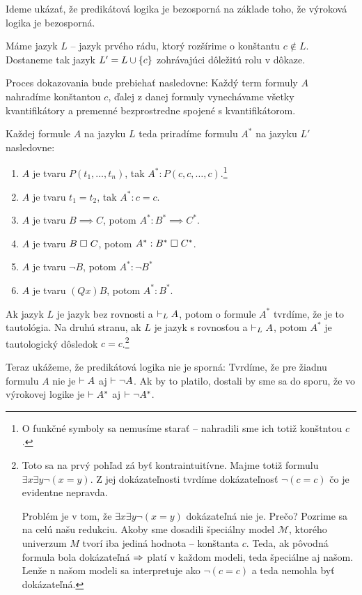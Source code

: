 \begin{priklad}
    Ideme ukázať, že predikátová logika je bezosporná na základe toho,
    že výroková logika je bezosporná.

    Máme jazyk $L$ -- jazyk prvého rádu,
    ktorý rozšírime o konštantu $c \notin L$.
    Dostaneme tak jazyk $L' = L \cup \{c\}$ zohrávajúci dôležitú
    rolu v dôkaze.

    Proces dokazovania bude prebiehať nasledovne:
    Každý term formuly $A$ nahradíme konštantou $c$,
    ďalej z danej formuly vynechávame všetky kvantifikátory a
    premenné bezprostredne spojené s kvantifikátorom.

    Každej formule $A$ na jazyku $L$ teda priradíme
    formulu $A^*$ na jazyku $L'$ nasledovne:
    \begin{enumerate}
        \item $A$ je tvaru $P(t_1, \dots ,t_n)$,
                tak $A^*: P(c, c, \dots,c)$.\footnote{
                O funkčné symboly sa nemusíme starať -- nahradili sme
                ich totiž konštntou $c$.
            }

        \item $A$ je tvaru $t_1=t_2$,
                tak $A^*: c=c$.

        \item $A$ je tvaru $B \implies C$,
                potom $A^*: B^* \implies C^*$.

        \item $A$ je tvaru $B \;\square\; C$,
                potom $A^*: B^* \;\square\; C^*$.

        \item $A$ je tvaru $\neg B$,
                potom $A^*: \neg B^*$

        \item $A$ je tvaru $(Qx) B$, potom $A^*: B^*$.
    \end{enumerate}

    Ak jazyk $L$ je jazyk bez rovnosti a $\vdash_L A$, potom
    o formule $A^*$ tvrdíme, že je to tautológia.
    Na druhú stranu, ak $L$ je jazyk s rovnosťou a $\vdash_L A$,
    potom $A^*$ je tautologický dôsledok $c=c$.\footnote{
        Toto sa na prvý pohľad zá byť kontraintuitívne. Majme totiž
        formulu $\exists x \exists y \neg (x=y)$. Z jej dokázateľnosti
        tvrdíme dokázateľnosť $\neg (c=c)$ čo je evidentne nepravda.

        Problém je v tom, že $\exists x \exists y \neg (x=y)$
        dokázateľná nie je. Prečo? Pozrime sa na celú našu redukciu.
        Akoby sme dosadili špeciálny model $\mathcal{M}$, ktorého
        univerzum $M$ tvorí iba jediná hodnota -- konštanta $c$.
        Teda, ak pôvodná formula bola dokázateľná $\Rightarrow$ platí v
        každom modeli, teda špeciálne aj našom. Lenže n našom modeli
        sa interpretuje ako $\neg (c=c)$ a teda nemohla byť
        dokázateľná.
    }

    Teraz ukážeme, že predikátová logika nie je sporná:
    Tvrdíme, že pre žiadnu formulu $A$ nie je $\vdash A$ aj 
    $\vdash \neg A$.
    Ak by to platilo, dostali by sme sa do sporu,
    že vo výrokovej logike je $\vdash A^*$ aj $\vdash \neg A^*$.
\end{priklad}
